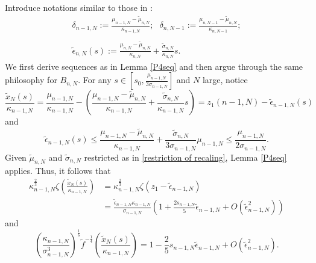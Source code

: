 \documentclass[11pt]{article}
\numberwithin{equation}{section}%
\numberwithin{theorem}{section}
\begin{document}
     Introduce notations similar to those in \cite{el2006rate}:
\begin{equation}\label{tildedeviation}
    \begin{array}{cc}
      \delta_{n-1,N}:=\frac{\mu_{n-1,N}-\tilde{\mu}_{n,N}}{\kappa_{n-1,N}};~~~
      \delta_{n,N-1}:=\frac{\mu_{n,N-1}-\tilde{\mu}_{n,N}}{\kappa_{n,N-1}};\\
      \\
      \tilde{\epsilon}_{n,N}(s):=\frac{\mu_{n,N}-\tilde{\mu}_{n,N}}{\kappa_{n,N}}+\frac{\tilde{\sigma}_{n,N}}{\kappa_{n,N}}s.
    \end{array}
\end{equation}
We first derive sequences as in Lemma \ref{P4seq} and then argue through the same philosophy for $B_{n,N}$. For any $s\in\left[s_0,\frac{\mu_{n-1,N}}{3\sigma_{n-1,N}}\right]$ and $N$ large, notice
\begin{equation*}
    \frac{\tilde{x}_N(s)}{\kappa_{n-1,N}}=\frac{\mu_{n-1,N}}{\kappa_{n-1,N}}-\left(\frac{\mu_{n-1,N}-\tilde{\mu}_{n,N}}{\kappa_{n-1,N}}+\frac{\tilde{\sigma}_{n,N}}{\kappa_{n-1,N}}s\right)=z_1(n-1,N)-\tilde{\epsilon}_{n-1,N}(s)
\end{equation*}
and
\begin{equation*}
    \tilde{\epsilon}_{n-1,N}(s)\le\frac{\mu_{n-1,N}-\tilde{\mu}_{n,N}}{\kappa_{n-1,N}}+\frac{\tilde{\sigma}_{n,N}}{3\sigma_{n-1,N}}\mu_{n-1,N}\le\frac{\mu_{n-1,N}}{2\sigma_{n-1,N}}.
\end{equation*}
Given $\tilde{\mu}_{n,N}$ and $\tilde{\sigma}_{n,N}$ restricted as in \eqref{restriction of recaling}, Lemma \ref{P4seq} applies. Thus, it follows that
\begin{equation}\label{seq'1}
    \begin{split}
        \kappa_{n-1,N}^\frac{2}{3}\zeta\left(\frac{\tilde{x}_N(s)}{\kappa_{n-1,N}}\right)&=\kappa_{n-1,N}^\frac{2}{3}\zeta\left(z_1-\tilde{\epsilon}_{n-1,N}\right)\\&=\frac{\tilde{\epsilon}_{n-1,N}\kappa_{n-1,N}}{\sigma_{n-1,N}}\left(1+\frac{2s_{n-1,N}}{5}\tilde{\epsilon}_{n-1,N}+O\left(\tilde{\epsilon}^2_{n-1,N}\right)\right)
    \end{split}
\end{equation}
and
\begin{equation}\label{seq'2}
        \left(\frac{\kappa_{n-1,N}}{\sigma^3_{n-1,N}}\right)^\frac{1}{6}\tilde{f}^{-\frac{1}{4}}\left(\frac{\tilde{x}_N(s)}{\kappa_{n-1,N}}\right)=1-\frac{2}{5}s_{n-1,N}\tilde{\epsilon}_{n-1,N}+O\left(\tilde{\epsilon}^2_{n-1,N}\right).
\end{equation}
\end{document}

